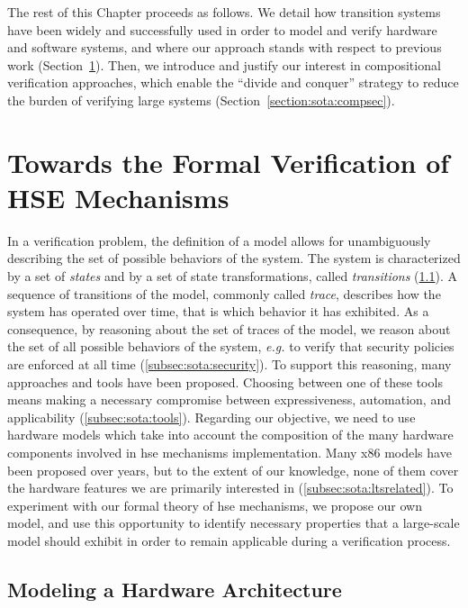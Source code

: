 The rest of this Chapter proceeds as follows.
%
We detail how transition systems have been widely and successfully used in order
to model and verify hardware and software systems, and where our approach stands
with respect to previous work (Section~\ref{sec:sota:formalisms}).
%
Then, we introduce and justify our interest in compositional verification
approaches, which enable the ``divide and conquer'' strategy to reduce the
burden of verifying large systems (Section~\ref{section:sota:compsec}).

\section{Towards the Formal Verification of HSE Mechanisms}
\label{sec:sota:formalisms}

In a verification problem, the definition of a model allows for unambiguously
describing the set of possible behaviors of the system.
%
The system is characterized by a set of \emph{states} and by a set of state
transformations, called \emph{transitions} (\ref{subsec:sota:ltsdef}).
%
A sequence of transitions of the model, commonly called \emph{trace}, describes
how the system has operated over time, that is which behavior it has exhibited.
%
As a consequence, by reasoning about the set of traces of the model, we reason
about the set of all possible behaviors of the system, \emph{e.g.} to verify
that security policies are enforced at all time (\ref{subsec:sota:security}).
%
To support this reasoning, many approaches and tools have been
proposed. Choosing between one of these tools means making a necessary
compromise between expressiveness, automation, and applicability
(\ref{subsec:sota:tools}).
%
Regarding our objective, we need to use hardware models which take into account
the composition of the many hardware components involved in \ac{hse} mechanisms
implementation.
%
Many x86 models have been proposed over years, but to the extent of our
knowledge, none of them cover the hardware features we are primarily interested
in (\ref{subsec:sota:ltsrelated}).
%
To experiment with our formal theory of \ac{hse} mechanisms, we propose our own
model, and use this opportunity to identify necessary properties that a
large-scale model should exhibit in order to remain applicable during a
verification process.

\subsection{Modeling a Hardware Architecture}
\label{subsec:sota:ltsdef}

